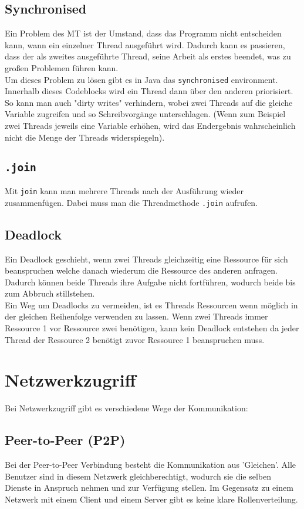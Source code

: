 \documentclass{article}
\begin{document}
	\subsection{Synchronised}
	Ein Problem des MT ist der Umstand, dass das Programm nicht entscheiden kann, wann ein einzelner Thread ausgeführt wird. Dadurch kann es passieren, dass der als zweites ausgeführte Thread, seine Arbeit als erstes beendet, was zu großen Problemen führen kann. \\
	Um dieses Problem zu lösen gibt es in Java das \texttt{synchronised} environment. Innerhalb dieses Codeblocks wird ein Thread dann über den anderen priorisiert. So kann man auch "dirty writes" verhindern, wobei zwei Threads auf die gleiche Variable zugreifen und so Schreibvorgänge unterschlagen. (Wenn zum Beispiel zwei Threads jeweils eine Variable erhöhen, wird das Endergebnis wahrscheinlich nicht die Menge der Threads widerspiegeln).
	\subsection{\texttt{.join}}
	Mit \texttt{join} kann man mehrere Threads nach der Ausführung wieder zusammenfügen. Dabei muss man die Threadmethode \texttt{.join} aufrufen.
	\subsection{Deadlock}
	Ein Deadlock geschieht, wenn zwei Threads gleichzeitig eine Ressource für sich beanspruchen welche danach wiederum die Ressource des anderen anfragen. Dadurch können beide Threads ihre Aufgabe nicht fortführen, wodurch beide bis zum Abbruch stillstehen. \\
	Ein Weg um Deadlocks zu vermeiden, ist es Threads Ressourcen wenn möglich in der gleichen Reihenfolge verwenden zu lassen. Wenn zwei Threads immer Ressource 1 vor Ressource zwei benötigen, kann kein Deadlock entstehen da jeder Thread der Ressource 2 benötigt zuvor Ressource 1 beanspruchen muss.
	\section{Netzwerkzugriff}
	Bei Netzwerkzugriff gibt es verschiedene Wege der Kommunikation:
	\subsection{Peer-to-Peer (P2P)}
	Bei der Peer-to-Peer Verbindung besteht die Kommunikation aus 'Gleichen'. Alle Benutzer sind in diesem Netzwerk gleichberechtigt, wodurch sie die selben Dienste in Anspruch nehmen und zur Verfügung stellen. Im Gegensatz zu einem Netzwerk mit einem Client und einem Server gibt es keine klare Rollenverteilung.
\end{document}
